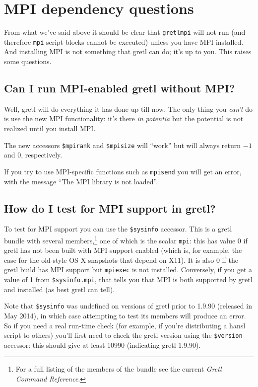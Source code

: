 \documentclass{article}
\begin{document}
\section{MPI dependency questions}
\label{sec:mpi-depend}

From what we've said above it should be clear that \texttt{gretlmpi}
will not run (and therefore \texttt{mpi} script-blocks cannot be
executed) unless you have MPI installed. And installing MPI is not
something that gretl can do; it's up to you. This raises some
questions.

\subsection{Can I run MPI-enabled gretl without MPI?}

Well, gretl will do everything it has done up till now. The only thing
you \textit{can't} do is use the new MPI functionality: it's there
\textit{in potentia} but the potential is not realized until you
install MPI.

The new accessors \verb|$mpirank| and \verb|$mpisize| will ``work''
but will always return $-1$ and $0$, respectively.

If you try to use MPI-specific functions such as \texttt{mpisend} you
will get an error, with the message ``The MPI library is not loaded''.

\subsection{How do I test for MPI support in gretl?}
\label{subsec:mpi-test}

To test for MPI support you can use the
\verb|$sysinfo| accessor. This is a gretl bundle with several
members,\footnote{For a full listing of the members of the bundle see
  the current \textit{Gretl Command Reference}.} one of which is the
scalar \texttt{mpi}: this has value 0 if gretl has not been built with
MPI support enabled (which is, for example, the case for the old-style
OS X snapshots that depend on X11). It is also 0 if the gretl build
has MPI support but \texttt{mpiexec} is not installed.  Conversely, if
you get a value of 1 from \verb|$sysinfo.mpi|, that tells you that MPI
is both supported by gretl and installed (as best gretl can tell).

Note that
\verb|$sysinfo| was undefined on versions of gretl prior to 1.9.90
(released in May 2014), in which case attempting to test its members
will produce an error. So if you need a real run-time check (for
example, if you're distributing a hansl script to others) you'll first
need to check the gretl version using the \verb|$version| accessor:
this should give at least 10990 (indicating gretl 1.9.90).
\end{document}
